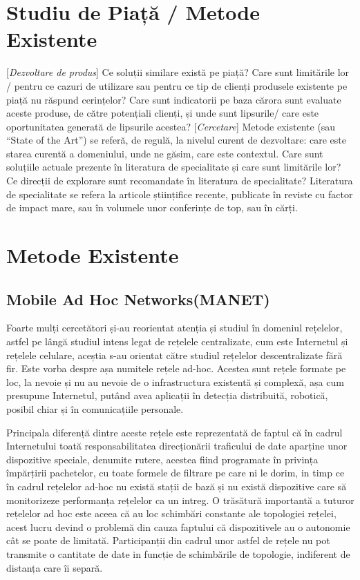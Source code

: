 \documentclass[12pt,a4paper]{report}
\newcommand{\worktype}[1]{[\textit{#1}] }
\newcommand{\dezvoltare}{\worktype{Dezvoltare de produs}}
\newcommand{\cercetare}{\worktype{Cercetare}}
\begin{document}
\chapter{Studiu de Piață / Metode Existente}
\dezvoltare Ce soluții similare există pe piață? Care sunt limitările lor / pentru ce cazuri de utilizare sau pentru ce tip de clienți produsele existente pe piață nu răspund cerințelor? Care sunt indicatorii pe baza cărora sunt evaluate aceste produse, de către potențiali clienți, și unde sunt lipsurile/ care este oportunitatea generată de lipsurile acestea?
\cercetare Metode existente (sau ``State of the Art'') se referă, de regulă, la nivelul curent de dezvoltare: care este starea curentă a domeniului, unde ne găsim, care este contextul. Care sunt soluțiile actuale prezente în literatura de specialitate și care sunt limitările lor? Ce direcții de explorare sunt recomandate în literatura de specialitate? Literatura de specialitate se refera la articole științifice recente, publicate în reviste cu factor de impact mare, sau în volumele unor conferințe de top, sau în cărți.
\chapter{Metode Existente}
\section{Mobile Ad Hoc Networks(MANET)}
Foarte mulți cercetători și-au reorientat atenția și studiul în domeniul rețelelor, astfel pe lângă studiul intens legat de rețelele centralizate, cum este Internetul și rețelele celulare, aceștia s-au orientat către studiul rețelelor descentralizate fără fir. Este vorba despre așa numitele rețele ad-hoc\cite{MITArticle}. Acestea sunt rețele formate pe loc, la nevoie și nu au nevoie de o infrastructura existentă și complexă, așa cum presupune Internetul, putând avea aplicații în detecția distribuită, robotică, posibil chiar și în comunicațiile personale.

Principala diferență dintre aceste rețele este reprezentată de faptul că în cadrul Internetului toată responsabilitatea direcționării traficului de date aparține unor dispozitive speciale, denumite rutere, acestea fiind programate în privința împărțirii pachetelor, cu toate formele de filtrare pe care ni le dorim, in timp ce în cadrul rețelelor ad-hoc nu există stații de bază și nu există dispozitive care să monitorizeze performanța rețelelor ca un intreg. O trăsătură importantă a tuturor rețelelor ad hoc este aceea că au loc schimbări constante ale topologiei rețelei, acest lucru devind o problemă din cauza faptului că dispozitivele au o autonomie cât se poate de limitată. Participanții din cadrul unor astfel de rețele nu pot transmite o cantitate de date in funcție de schimbările de topologie, indiferent de distanța care îi separă.
\end{document}
